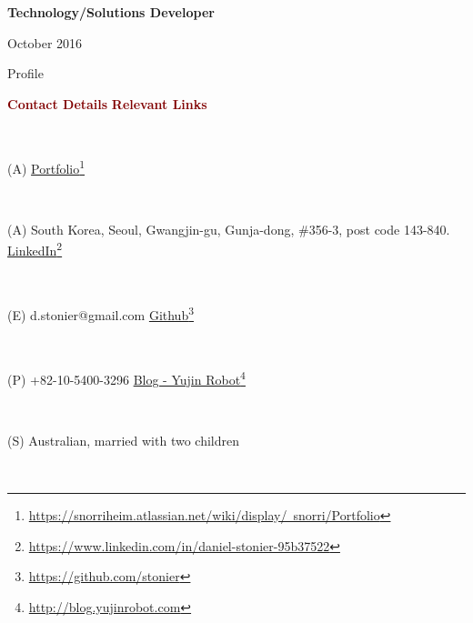 \documentclass[a4paper,10pt]{article}
\begin{document}

\vspace{-2.5em}

\begin{center}
  \textbf{Technology/Solutions Developer} \\
  \begin{small} October 2016 \end{small}
\end{center}


\vspace{-2.5em}

\begin{cvsection}{Profile}

\vspace{-2em}


\rmfamily

\begin{small} \textcolor{maroon}{\textbf{Contact Details}} \hfill \textcolor{maroon}{\textbf{Relevant Links}} \end{small}  \\ 
\begin{small} (A)  \hfill \href{https://snorriheim.atlassian.net/wiki/display/~snorri/Portfolio}{Portfolio}\footnote{\href{https://snorriheim.atlassian.net/wiki/display/~snorri/Portfolio}{https://snorriheim.atlassian.net/wiki/display/~snorri/Portfolio}} \end{small} \\  
\begin{small} (A) South Korea, Seoul, Gwangjin-gu, Gunja-dong, \#356-3, post code 143-840. \hfill \href{https://www.linkedin.com/in/daniel-stonier-95b37522}{LinkedIn}\footnote{\href{https://www.linkedin.com/in/daniel-stonier-95b37522}{https://www.linkedin.com/in/daniel-stonier-95b37522}} \end{small}  \\ 
\begin{small} (E) d.stonier@gmail.com \hfill \href{https://github.com/stonier}{Github}\footnote{\href{https://github.com/stonier}{https://github.com/stonier}} \end{small} \\  
\begin{small} (P) +82-10-5400-3296 \hfill \href{http://blog.yujinrobot.com/}{Blog - Yujin Robot}\footnote{\href{http://blog.yujinrobot.com/}{http://blog.yujinrobot.com}} \end{small} \\
\begin{small} (S) Australian, married with two children \end{small} \\


\end{cvsection}
\end{document}
